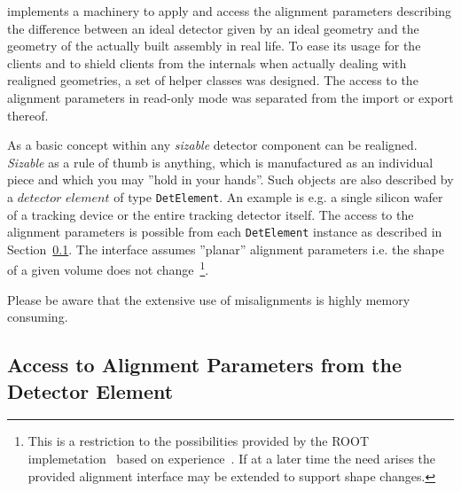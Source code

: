 \documentclass[10pt,a4paper]{article}
\begin{document}
\noindent
\DDA implements a machinery to apply and access the alignment parameters
describing the difference between an ideal detector given by an ideal geometry
and the geometry of the actually built assembly in real life.
To ease its usage for the clients and to shield clients from the 
internals when actually dealing with realigned geometries, a set of 
helper classes was designed. The access to the alignment parameters 
in read-only mode was separated from the import or export thereof.

\noindent
As a basic concept within \DDhep any {\it{sizable}} detector component
can be realigned. {\it{Sizable}} as a rule of thumb is anything, which 
is manufactured as an individual piece and which you may ''hold in your hands''.
Such objects are also described by a $detector$ $element$ of type {\tt DetElement}.
An example is e.g. a single silicon wafer of a tracking device or the entire
tracking detector itself.
The access to the alignment parameters is possible from each {\tt DetElement}
instance as described in Section~\ref{sec:ddalign-user-manual-misalignment-access}.
The interface assumes ''planar'' alignment parameters i.e. the shape of 
a given volume does not change~\footnote{This is a restriction to the 
possibilities provided by the ROOT implemetation~\cite{bib:ROOT-tgeo}
based on experience~\cite{bib:chris-parkes-priv-comm}.
If at a later time the need arises the provided alignment interface may 
be extended to support shape changes.}.

\noindent
Please be aware that the extensive use of misalignments is highly memory
consuming.

\noindent
\subsection{Access to Alignment Parameters from the Detector Element}
\label{sec:ddalign-user-manual-misalignment-access}
\end{document}
